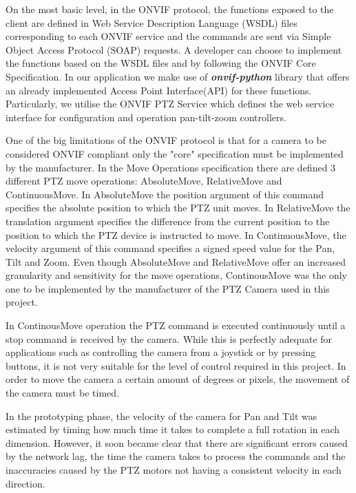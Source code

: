 \documentclass{l4proj}
\begin{document}
On the most basic level, in the ONVIF protocol, the functions exposed to the client are defined in Web Service Description Language (WSDL) files corresponding to each ONVIF service and the commands are sent via Simple Object Access Protocol (SOAP) requests. A developer can choose to implement the functions based on the WSDL files and by following the ONVIF Core Specification. In our application we make use of
\textbf{\textit{onvif-python}} library that offers an already implemented Access Point Interface(API) for these functions. Particularly, we utilise the ONVIF PTZ Service which defines the web service interface for configuration and operation pan-tilt-zoom controllers. 



One of the big limitations of the ONVIF protocol is that for a camera to be considered ONVIF compliant only the "core" specification must be implemented by the manufacturer. In the Move Operations specification there are defined 3 different PTZ move operations: AbsoluteMove, RelativeMove and ContinuousMove. In AbsoluteMove the position argument of this command specifies the absolute position to which the PTZ unit moves. In RelativeMove the translation argument specifies the difference from the current position to the position to which the PTZ device is instructed to move. In ContinuousMove, the velocity argument of this command specifies a signed speed value for the Pan, Tilt and Zoom.  Even though AbsoluteMove and RelativeMove offer an increased granularity and sensitivity for the move operations,  ContinousMove was the only one to be implemented by the manufacturer of the PTZ Camera used in this project. 

In ContinousMove operation the PTZ command is executed continuously until a stop command is received by the camera. While this is perfectly adequate for applications such as controlling the camera from a joystick or by pressing buttons, it is not very suitable for the level of control required in this project. In order to move the camera a certain amount of degrees or pixels, the movement of the camera must be timed. 

In the prototyping phase, the velocity of the camera for Pan and Tilt was estimated by timing how much time it takes to complete a full rotation in each dimension. However, it soon became clear that there are significant errors caused by the network lag, the time the camera takes to process the commands and the inaccuracies caused by the PTZ motors not having a consistent velocity in each direction. 
\end{document}
